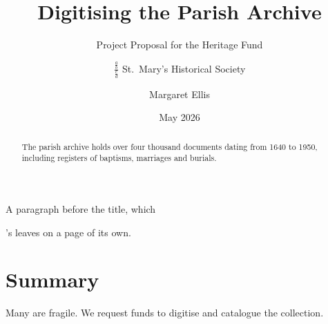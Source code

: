 \documentclass{scrartcl}
\title{Digitising the Parish Archive}
\subtitle{Project Proposal for the Heritage Fund}
\author{$\displaystyle\frac{\frac{a}{b}}{\frac{c}{d}}$ St.\ Mary's Historical Society \and Margaret Ellis}
\date{May 2026}
\begin{document}
A paragraph before the title, which \maketitle's \clearpage leaves on a page of its own.
\maketitle
\begin{abstract}
The parish archive holds over four thousand documents dating from 1640 to 1950, including registers of baptisms, marriages and burials.
\end{abstract}
\section{Summary}
Many are fragile. We request funds to digitise and catalogue the collection.
\end{document}
